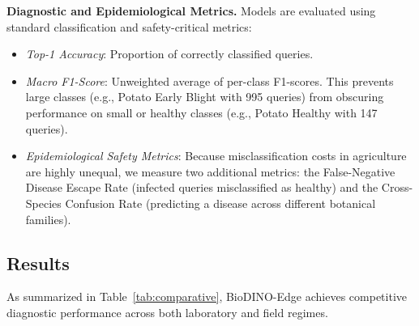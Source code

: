 \documentclass[conference]{IEEEtran}
\begin{document}
\textbf{Diagnostic and Epidemiological Metrics.} Models are evaluated using standard classification and safety-critical metrics:
\begin{itemize}\setlength{\itemsep}{1pt plus 0.5pt}\setlength{\parsep}{0pt}
    \item \textit{Top-1 Accuracy}: Proportion of correctly classified queries.
    \item \textit{Macro F1-Score}: Unweighted average of per-class F1-scores. This prevents large classes (e.g., Potato Early Blight with 995 queries) from obscuring performance on small or healthy classes (e.g., Potato Healthy with 147 queries).
    \item \textit{Epidemiological Safety Metrics}: Because misclassification costs in agriculture are highly unequal, we measure two additional metrics: the False-Negative Disease Escape Rate (infected queries misclassified as healthy) and the Cross-Species Confusion Rate (predicting a disease across different botanical families).
\end{itemize}

\subsection{Results}
\label{sec:main_results}
As summarized in Table~\ref{tab:comparative}, BioDINO-Edge achieves competitive diagnostic performance across both laboratory and field regimes.
\end{document}
